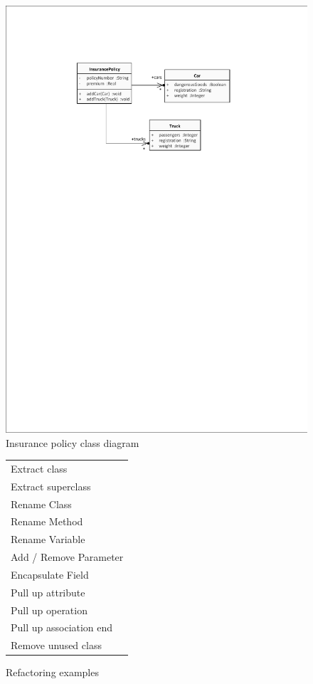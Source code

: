\documentclass{llncs}
\begin{document}
\begin{figure}[ht]
 \centering
 \includegraphics{images/addCar-class_diagram.pdf}
 \caption{Insurance policy class diagram}
 \label{fig:insurancepolicy}
\end{figure}

\begin{figure}
 \centering
 \begin{tabular}[]{l}
  \hline
  Extract class\\
  Extract superclass\\
  Rename Class\\
  Rename Method\\
  Rename Variable\\
  Add / Remove Parameter\\
  Encapsulate Field\\
  Pull up attribute\\
  Pull up operation\\
  Pull up association end\\
  Remove unused class\\
  \hline
 \end{tabular}
 \caption{Refactoring examples}
 \label{fig:refactoringlist}
\end{figure}
\end{document}

